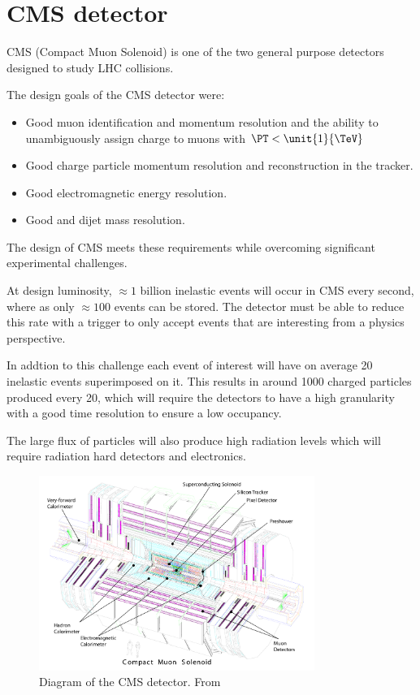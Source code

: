 \section{CMS detector}
CMS (Compact Muon Solenoid)\cite{cms} is one of the two general purpose
detectors designed to study LHC collisions. 


The design goals of the CMS detector were: 

\begin{itemize}
  \item Good muon identification and momentum resolution and the ability to unambiguously assign charge to muons with $\PT <
\unit{1}{\TeV}$
  \item Good charge particle momentum resolution and reconstruction in the
tracker.
  \item Good electromagnetic energy resolution. 
  \item Good \ETmiss and dijet mass resolution.
\end{itemize}

The design of CMS meets these requirements while overcoming significant
experimental challenges. 

At design luminosity, $\approx 1 $ billion inelastic events will occur in CMS
every second, where as only $\approx 100 $ events can be stored. The detector
must be able to reduce this rate with a trigger to only accept events that are
interesting from a physics perspective.

In addtion to this challenge each event of interest will have on average 20
inelastic events superimposed on it. This results in around 1000 charged
particles produced every \unit{20}{\ns}, which will require the detectors to
have a high granularity with a good time resolution to ensure a low occupancy.

The large flux of particles will also produce high radiation levels which will
require radiation hard detectors and electronics.

\begin{figure}[htb!]
  \centering
  \includegraphics[width=0.8\textwidth]{cms}
  \caption{Diagram of the CMS detector. From \cite{cms}}
  \label{fig:CMSnc}
\end{figure}

